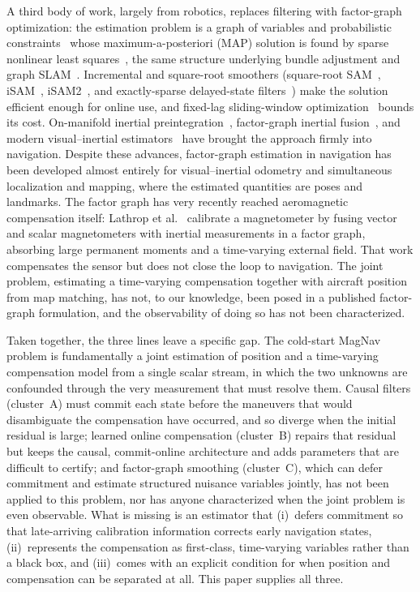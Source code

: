 \documentclass{IEEEtaes}
\begin{document}
A third body of work, largely from robotics, replaces filtering with factor-graph
optimization: the estimation problem is a graph of variables and probabilistic
constraints~\cite{kschischang2001} whose maximum-a-posteriori (MAP) solution is
found by sparse nonlinear least squares~\cite{dellaert2017,dellaert2012}, the same
structure underlying bundle adjustment and graph SLAM~\cite{triggs2000,grisetti2010,kummerle2011}.
Incremental and square-root smoothers (square-root
SAM~\cite{dellaert2006}, iSAM~\cite{kaess2008}, iSAM2~\cite{kaess2012}, and
exactly-sparse delayed-state filters~\cite{eustice2006}) make the solution
efficient enough for online use, and fixed-lag sliding-window
optimization~\cite{sibley2010,leutenegger2015} bounds its cost. On-manifold inertial
preintegration~\cite{forster2017}, factor-graph inertial
fusion~\cite{indelman2013}, and modern visual--inertial estimators~\cite{qin2018}
have brought the approach firmly into navigation. Despite these advances,
factor-graph estimation in navigation has been developed almost entirely for
visual--inertial odometry and simultaneous localization and mapping, where the
estimated quantities are poses and landmarks. The factor graph has very recently
reached aeromagnetic compensation itself: Lathrop et al.~\cite{lathrop2024}
calibrate a magnetometer by fusing vector and scalar magnetometers with inertial
measurements in a factor graph, absorbing large permanent moments and a
time-varying external field. That work compensates the sensor but does not close
the loop to navigation. The joint problem, estimating a time-varying compensation
together with aircraft position from map matching, has not, to our knowledge, been
posed in a published factor-graph formulation, and the observability of doing so has
not been characterized.

Taken together, the three lines leave a specific gap. The cold-start MagNav problem
is fundamentally a joint estimation of position and a time-varying
compensation model from a single scalar stream, in which the two unknowns are
confounded through the very measurement that must resolve them. Causal filters
(cluster~A) must commit each state before the maneuvers that would disambiguate the
compensation have occurred, and so diverge when the initial residual is large;
learned online compensation (cluster~B) repairs that residual but keeps the causal,
commit-online architecture and adds parameters that are difficult to certify; and
factor-graph smoothing (cluster~C), which can defer commitment and estimate
structured nuisance variables jointly, has not been applied to this problem, nor has
anyone characterized when the joint problem is even observable. What is missing is
an estimator that (i)~defers commitment so that late-arriving calibration
information corrects early navigation states, (ii)~represents the compensation as
first-class, time-varying variables rather than a black box, and (iii)~comes with
an explicit condition for when position and compensation can be separated at all.
This paper supplies all three.
\end{document}
